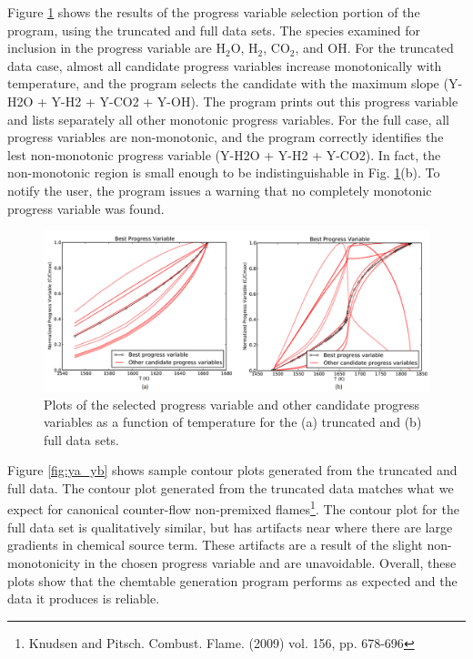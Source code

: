 \documentclass[11pt]{article}
\begin{document}
Figure \ref{fig:xa_xb} shows the results of the progress variable
selection portion of the program, using the truncated and full data
sets. The species examined for inclusion in the progress variable are
H$_2$O, H$_2$, CO$_2$, and OH. For the truncated data case, almost all
candidate progress variables increase monotonically with temperature,
and the program selects the candidate with the maximum slope (Y-H2O +
Y-H2 + Y-CO2 + Y-OH). The program prints out this progress variable
and lists separately all other monotonic progress variables. For the
full case, all progress variables are non-monotonic, and the program
correctly identifies the lest non-monotonic progress variable (Y-H2O +
Y-H2 + Y-CO2). In fact, the non-monotonic region is small enough to be
indistinguishable in Fig. \ref{fig:xa_xb}(b). To notify the user, the
program issues a warning that no completely monotonic progress
variable was found.

\begin{figure} [h]
\centering
\includegraphics[width=\textwidth]{xa_xb.PNG}
\caption{\label{fig:xa_xb} Plots of the selected progress variable and
  other candidate progress variables as a function of temperature for
  the (a) truncated and (b) full data sets.  }
\end{figure}

Figure \ref{fig:ya_yb} shows sample contour plots generated from the
truncated and full data. The contour plot generated from the truncated
data matches what we expect for canonical counter-flow non-premixed
flames\footnote{Knudsen and Pitsch. Combust. Flame. (2009) vol. 156,
  pp. 678-696}. The contour plot for the full data set is
qualitatively similar, but has artifacts near where there are large
gradients in chemical source term. These artifacts are a result of the
slight non-monotonicity in the chosen progress variable and are
unavoidable. Overall, these plots show that the chemtable generation
program performs as expected and the data it produces is reliable.
\end{document}
